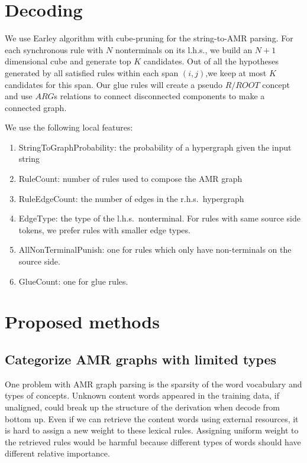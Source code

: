 \section{Decoding}
We use Earley algorithm with cube-pruning \cite{ChiangCL} for the string-to-AMR parsing. 
For each synchronous rule with $N$ nonterminals on its l.h.s., we build an $N+1$ dimensional cube and generate top $K$ candidates. 
Out of all the hypotheses generated by all satisfied rules within each span $(i,j)$,we keep at most $K$ candidates for this span.
Our glue rules will create a pseudo $R/ROOT$ concept and use $ARG$s relations to connect
disconnected components to make a connected graph.


We use the following local features:
\begin{enumerate}\footnotesize
    \item StringToGraphProbability: the probability of a hypergraph given the input string
    \item RuleCount: number of rules used to compose the AMR graph
    \item RuleEdgeCount: the number of edges in the r.h.s.\ hypergraph 
    \item EdgeType: the type of the l.h.s.\ nonterminal. For rules with same source side tokens, we prefer rules with smaller edge types.
    \item AllNonTerminalPunish: one for rules which only have non-terminals on the source side.
    \item GlueCount: one for glue rules.  
\end{enumerate}

\section{Proposed methods}
\subsection{Categorize AMR graphs with limited types}
One problem with AMR graph parsing is the sparsity of the word vocabulary and types of concepts. Unknown content words appeared in the training data, if unaligned, could
break up the structure of the derivation when decode from bottom up. Even if we can retrieve the content words using external resources, it is hard to assign a new weight to these lexical rules.
Assigning uniform weight to the retrieved rules would be harmful because different types of words should have different relative importance.


